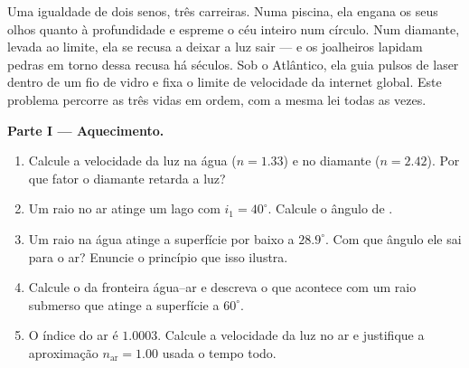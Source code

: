 \begin{problem}
\label{pb:g10:refraction:1}
Uma igualdade de dois senos, três carreiras. Numa piscina, ela engana os
seus olhos quanto à profundidade e espreme o céu inteiro num círculo. Num
diamante, levada ao limite, ela se recusa a deixar a luz sair --- e os
joalheiros lapidam pedras em torno dessa recusa há séculos. Sob o
Atlântico, ela guia pulsos de laser dentro de um fio de vidro e fixa o
limite de velocidade da internet global. Este problema percorre as três
vidas em ordem, com a mesma lei todas as vezes.

\medskip
\noindent\textbf{Parte I --- Aquecimento.}
\begin{enumerate}
  \item Calcule a velocidade da luz na água ($n = 1.33$) e no diamante
        ($n = 2.42$). Por que fator o diamante retarda a luz?
  \item Um raio no ar atinge um lago com $i_1 = 40^\circ$. Calcule o
        ângulo de .
  \item Um raio na água atinge a superfície por baixo a $28.9^\circ$. Com
        que ângulo ele sai para o ar? Enuncie o princípio que isso
        ilustra.
  \item Calcule o  da fronteira água--ar e descreva o que
        acontece com um raio submerso que atinge a superfície a
        $60^\circ$.
  \item O índice do ar é $1.0003$. Calcule a velocidade da luz no ar e
        justifique a aproximação $n_{\text{ar}} = 1.00$ usada o tempo
        todo.
\end{enumerate}


\end{problem}
